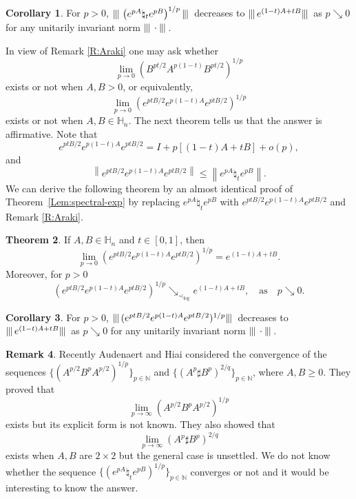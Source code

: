 \documentclass[12pt, reqno]{amsart}
\numberwithin{equation}{section}
\theoremstyle{definition}
\newtheorem{theorem}{Theorem}[section]
\newtheorem{corollary}[theorem]{Corollary}
\newtheorem{remark}[theorem]{Remark}
\renewcommand{\ge}{\geqslant}
\renewcommand{\le}{\leqslant}
\newcommand\norm[1]{\left\lVert#1\right\rVert}
\newcommand\ui{\| \!!!|}
\def\ui{\|\hspace{-.25mm} |\,}
\def\H{\mathbb H}
\def\N{\mathbb N}
\begin{document}
\begin{corollary} 
For $p> 0$, $\ui \left(e^{pA} \natural_t e^{pB}\right)^{1/p} \ui$ decreases to $ \ui e^{(1-t)A+t B}\ui$ as $p \searrow 0$ for any unitarily invariant norm $\ui \cdot \ui$.
\end{corollary}

In view of Remark \ref{R:Araki} one may ask whether 
\[
\lim_{p\to 0} \left(B^{pt/2}A^{p(1-t)}B^{pt/2} \right)^{1/p}
\] exists or not when $A, B>0$, or equivalently,
\[
\lim_{p\to 0} (e^{ptB/2}e^{p(1-t)A}e^{ptB/2})^{1/p}
\] exists or not when $A, B\in \H_n$. The next theorem tells us that the answer is affirmative.
Note that 
\[
e^{ptB/2}e^{p(1-t)A}e^{ptB/2} = I+p[(1-t)A+tB]+o(p),
\]
 and
 \[
 \norm{e^{ptB/2}e^{p(1-t)A}e^{ptB/2}}\le \norm{e^{pA}\natural_t e^{pB}}.
 \]
 We can derive the following theorem by an almost identical proof of Theorem~\ref{Lem:spectral-exp} by replacing $ 
e^{pA} \natural_t e^{pB}$ with $e^{ptB/2}e^{p(1-t)A}e^{ptB/2}$ and Remark \ref{R:Araki}.

\begin{theorem}\label{thm:exp}
If $A,B \in \H_n$  and $t\in [0, 1]$, then
 \[
 \lim_{p \to 0} (e^{ptB/2}e^{p(1-t)A}e^{ptB/2})^{1/p} = e^{(1-t)A+t B}.
 \]
Moreover, for $p> 0$
\[
(e^{ptB/2}e^{p(1-t)A}e^{ptB/2})^{1/p}\searrow_{\prec_{\log}} e^{(1-t)A+tB}, \quad \text{as}\quad p\searrow 0.
\]
\end{theorem}

\begin{corollary}
For $p>0$, $\ui (e^{ptB/2}e^{p(1-t)A}e^{ptB/2})^{1/p}\ui$ decreases to $\ui e^{(1-t)A+t B}\ui $ as $p\searrow 0$ for any unitarily invariant norm $\ui \cdot \ui$.
\end{corollary}	

\begin{remark}
Recently Audenaert and Hiai  \cite {AH16} considered the convergence of the sequences $\{ (A^{p/2} B^p A^{p/2})^{1/p} \}_{p\in \N}$ and $\{(A^p\sharp B^p)^{2/q}\}_{p\in \N}$, where $A, B\ge 0$. They
proved that 
\[
\lim_{p\to \infty} (A^{p/2} B^p A^{p/2})^{1/p}
\]
exists but its explicit form  is  not known. They also showed that $$ \lim_{p\to \infty} (A^p\sharp B^p)^{2/q}$$ exists when $A, B$ are $2\times 2$ but the general case is unsettled. We do not know whether the sequence $\{\left(e^{pA} \natural_t e^{pB}\right)^{1/p}\}_{p\in \N}$ converges or not and it would be interesting to know the answer.
\end{remark}

\end{document}
